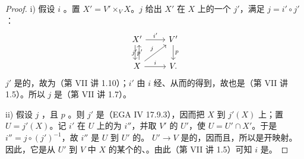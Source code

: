 \begin{proof}
i) 假设 $i$ 。置 $X'=V'\times_VX$。$j$ 给出 $X'$ 在 $X$ 上的一个 $j'$，满足 $j=i'\circ j'$：
\[
\begin{tikzcd}X'\arrow[r,"i'"]\arrow[d,"p'",shift right]&V'\arrow[d,"p"]\\X\arrow[u,"j'",shift right]\arrow[ur,"j"]\arrow[r,"i"]&V.\end{tikzcd}
\]
$j'$ 是的，故为（第 VII 讲 1.10）；$i'$ 由 $i$ 经、从而的得到，故也是（第 VII 讲 1.5）。所以 $j$ 是（第 VII 讲 1.7）。

ii) 假设 $j$ ，且 $p$ 。则 $j'$ 是（EGA IV 17.9.3），因而把 $X$ 到 $j'(X)$ 上；置 $U=j'(X)$。记 $i'$ 在 $U$ 上的为 $i''$，并取 $V'$ 的 $U'$，使 $U=U'\cap X'$。于是 $i''=j\circ(j')^{-1}$，故 $i''$ 是 $U$ 到 $U'$ 的。 $U'\to V$ 是的，因而且，所以是开映射。因此，它是从 $U'$ 到 $V$ 中 $X$ 的某个的、。由此（第 VII 讲 1.5）可知 $i$ 是。


\end{proof}
